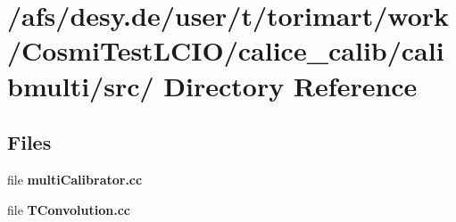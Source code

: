 \section{/afs/desy.de/user/t/torimart/work/CosmiTestLCIO/calice\_\-calib/calibmulti/src/ Directory Reference}
\label{dir_04fc741c74b35281c10d8f9d09e99500}
\subsection*{Files}
\begin{DoxyCompactItemize}
\item 
file {\bfseries multiCalibrator.cc}
\item 
file {\bfseries TConvolution.cc}
\end{DoxyCompactItemize}
